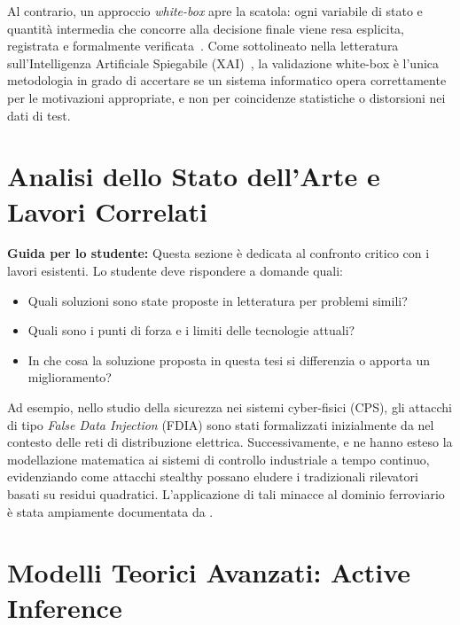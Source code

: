 Al contrario, un approccio \emph{white-box} apre la scatola: ogni variabile di stato e quantità intermedia che concorre alla decisione finale viene resa esplicita, registrata e formalmente verificata~\cite{nidhra2012black}. Come sottolineato nella letteratura sull'Intelligenza Artificiale Spiegabile (XAI)~\cite{doshi2017towards}, la validazione white-box è l'unica metodologia in grado di accertare se un sistema informatico opera correttamente per le motivazioni appropriate, e non per coincidenze statistiche o distorsioni nei dati di test.


\section{Analisi dello Stato dell'Arte e Lavori Correlati}
\label{sec:lavori-correlati}

\textbf{Guida per lo studente:} Questa sezione è dedicata al confronto critico con i lavori esistenti. Lo studente deve rispondere a domande quali:
\begin{itemize}
    \item Quali soluzioni sono state proposte in letteratura per problemi simili?
    \item Quali sono i punti di forza e i limiti delle tecnologie attuali?
    \item In che cosa la soluzione proposta in questa tesi si differenzia o apporta un miglioramento?
\end{itemize}

Ad esempio, nello studio della sicurezza nei sistemi cyber-fisici (CPS), gli attacchi di tipo \emph{False Data Injection} (FDIA) sono stati formalizzati inizialmente da \textcite{liu2009false} nel contesto delle reti di distribuzione elettrica. Successivamente, \textcite{teixeira2015secure} e \textcite{deng2017false} ne hanno esteso la modellazione matematica ai sistemi di controllo industriale a tempo continuo, evidenziando come attacchi stealthy possano eludere i tradizionali rilevatori basati su residui quadratici. L'applicazione di tali minacce al dominio ferroviario è stata ampiamente documentata da \textcite{soderi2023railway}.


\section{Modelli Teorici Avanzati: Active Inference}
\label{sec:active-inference-bg}

